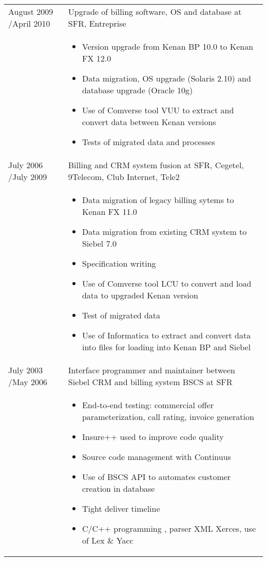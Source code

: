 \documentclass[a4paper,11pt]{letter}
\begin{document}
\begin{tabular}{p{}p{}}
August 2009 \slash April 2010 & Upgrade of billing software, OS and database at SFR, Entreprise\\
& \begin{itemize}
\item        Version upgrade from Kenan BP 10.0 to Kenan FX 12.0
\item        Data migration, OS upgrade (Solaris 2.10) and database upgrade (Oracle 10g)
\item        Use of Comverse tool VUU to extract and convert data between Kenan versions
\item        Tests of migrated data and processes
\end{itemize} \\


July 2006 \slash July 2009 & Billing and CRM system fusion at SFR, Cegetel, 9Telecom, Club Internet, Tele2 \\
	
& \begin{itemize}
\item         Data migration of legacy billing sytems to Kenan FX 11.0
\item         Data migration from existing CRM system to Siebel 7.0
\item         Specification writing
\item         Use of Comverse tool LCU to convert and load data to upgraded Kenan version
\item         Test of migrated data
\item         Use of Informatica to extract and convert data into files for loading into Kenan BP and Siebel
\end{itemize} \\

July 2003 \slash May 2006 & Interface programmer and maintainer between Siebel CRM and billing system BSCS at SFR \\
	

& \begin{itemize}
\item     End-to-end testing: commercial offer parameterization, call rating, invoice generation
\item     Insure++ used to improve code quality
\item     Source code management with Continuus
\item     Use of BSCS API to automates customer creation in database
\item     Tight deliver timeline
\item     C/C++ programming , parser XML Xerces, use of Lex \& Yacc
\end{itemize} \\
	


\end{tabular}
\end{document}
